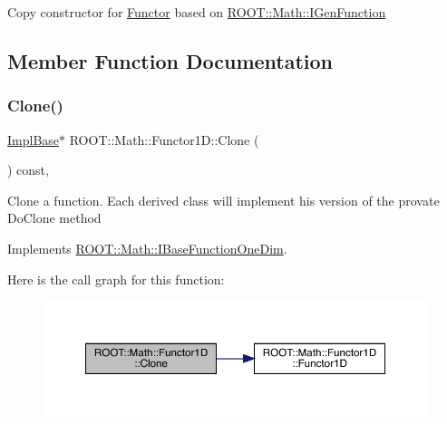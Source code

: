 Copy constructor for \mbox{\hyperlink{classROOT_1_1Math_1_1Functor}{Functor}} based on \mbox{\hyperlink{namespaceROOT_1_1Math_afe6400b4439b79d54c41fb9f5c5af171}{R\+O\+O\+T\+::\+Math\+::\+I\+Gen\+Function}} 

\subsection{Member Function Documentation}
\mbox{\label{classROOT_1_1Math_1_1Functor1D_af77ece084fc56e41c06e32e0f78a88a9}} 
\subsubsection{\texorpdfstring{Clone()}{Clone()}\hspace{0.1cm}{\footnotesize\ttfamily [1/2]}}
{\footnotesize\ttfamily \mbox{\hyperlink{classROOT_1_1Math_1_1Functor1D_a1ade2017edb7db0cbaf9a27a864f4dd3}{Impl\+Base}}$\ast$ R\+O\+O\+T\+::\+Math\+::\+Functor1\+D\+::\+Clone (\begin{DoxyParamCaption}{ }\end{DoxyParamCaption}) const\hspace{0.3cm}{\ttfamily [inline]}, {\ttfamily [virtual]}}

Clone a function. Each derived class will implement his version of the provate Do\+Clone method 

Implements \mbox{\hyperlink{classROOT_1_1Math_1_1IBaseFunctionOneDim_a656dbb4dfc43e8d1566442bfb1a717fd}{R\+O\+O\+T\+::\+Math\+::\+I\+Base\+Function\+One\+Dim}}.

Here is the call graph for this function\+:
\nopagebreak
\begin{figure}[H]
\begin{center}
\leavevmode
\includegraphics[width=350pt]{dc/d6d/classROOT_1_1Math_1_1Functor1D_af77ece084fc56e41c06e32e0f78a88a9_cgraph}
\end{center}
\end{figure}
\mbox{\label{classROOT_1_1Math_1_1Functor1D_af77ece084fc56e41c06e32e0f78a88a9}} 
